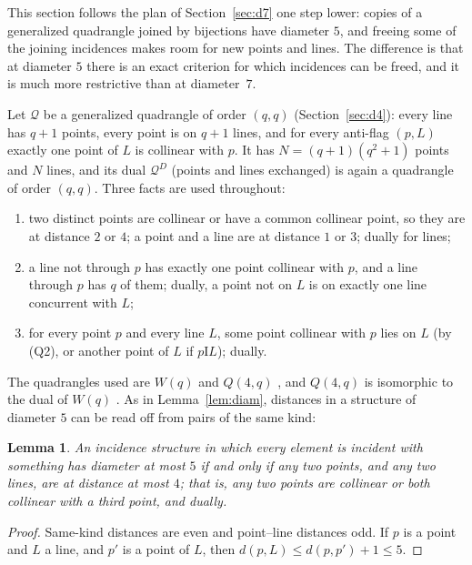 \documentclass[11pt]{amsart}
\newtheorem{lemma}[theorem]{Lemma}
\theoremstyle{definition}
\theoremstyle{remark}
\newcommand{\I}{\mathrel{\mathrm{I}}}
\newcommand{\cQ}{\mathcal{Q}}
\begin{document}
This section follows the plan of Section~\ref{sec:d7} one step lower: copies of a generalized quadrangle joined by bijections have diameter $5$, and freeing some of the joining incidences makes room for new points and lines. The difference is that at diameter $5$ there is an exact criterion for which incidences can be freed, and it is much more restrictive than at diameter~$7$.

Let $\cQ$ be a generalized quadrangle of order $(q,q)$ (Section~\ref{sec:d4}): every line has $q+1$ points, every point is on $q+1$ lines, and for every anti-flag $(p,L)$ exactly one point of $L$ is collinear with $p$. It has $N=(q+1)(q^2+1)$ points and $N$ lines, and its dual $\cQ^D$ (points and lines exchanged) is again a quadrangle of order $(q,q)$. Three facts are used throughout:
\begin{enumerate}[label=\textup{(Q\arabic*)},leftmargin=3em]
\item two distinct points are collinear or have a common collinear point, so they are at distance $2$ or $4$; a point and a line are at distance $1$ or $3$; dually for lines;
\item a line not through $p$ has exactly one point collinear with $p$, and a line through $p$ has $q$ of them; dually, a point not on $L$ is on exactly one line concurrent with $L$;
\item for every point $p$ and every line $L$, some point collinear with $p$ lies on $L$ (by (Q2), or another point of $L$ if $p\I L$); dually.
\end{enumerate}
The quadrangles used are $W(q)$ and $Q(4,q)$ \cite{PT}, and $Q(4,q)$ is isomorphic to the dual of $W(q)$ \cite[3.2.1]{PT}. As in Lemma~\ref{lem:diam}, distances in a structure of diameter $5$ can be read off from pairs of the same kind:

\begin{lemma}\label{lem:diam5}
An incidence structure in which every element is incident with something has diameter at most $5$ if and only if any two points, and any two lines, are at distance at most $4$; that is, any two points are collinear or both collinear with a third point, and dually.
\end{lemma}

\begin{proof}
Same-kind distances are even and point--line distances odd. If $p$ is a point and $L$ a line, and $p'$ is a point of $L$, then $d(p,L)\le d(p,p')+1\le 5$.
\end{proof}
\end{document}
